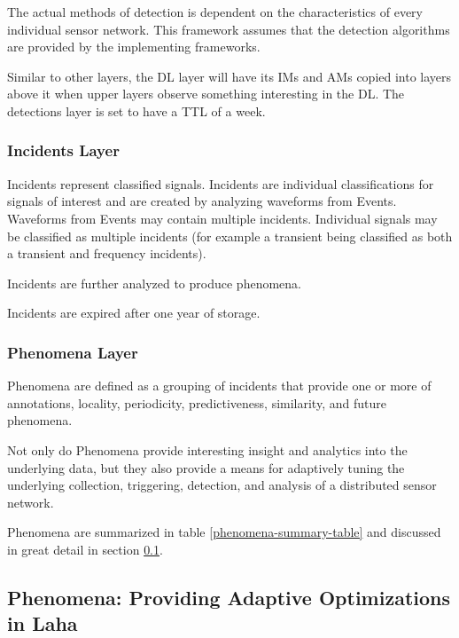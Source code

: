 The actual methods of detection is dependent on the characteristics of every individual sensor network. This framework assumes that the detection algorithms are provided by the implementing frameworks.

Similar to other layers, the DL layer will have its IMs and AMs copied into layers above it when upper layers observe something interesting in the DL. The detections layer is set to have a TTL of a week.

\subsubsection{Incidents Layer}
Incidents represent classified signals. Incidents are individual classifications for signals of interest and are created by analyzing waveforms from Events. Waveforms from Events may contain multiple incidents. Individual signals may be classified as multiple incidents (for example a transient being classified as both a transient and frequency incidents). 

Incidents are further analyzed to produce phenomena. 

Incidents are expired after one year of storage. 


\subsubsection{Phenomena Layer}
Phenomena are defined as a grouping of incidents that provide one or more of annotations, locality, periodicity, predictiveness, similarity, and future phenomena. 

Not only do Phenomena provide interesting insight and analytics into the underlying data, but they also provide a means for adaptively tuning the underlying collection, triggering, detection, and analysis of a distributed sensor network.

Phenomena are summarized in table \ref{phenomena-summary-table} and discussed in great detail in section \ref{phenomena}.

\subsection{Phenomena: Providing Adaptive Optimizations in Laha} \label{phenomena}

